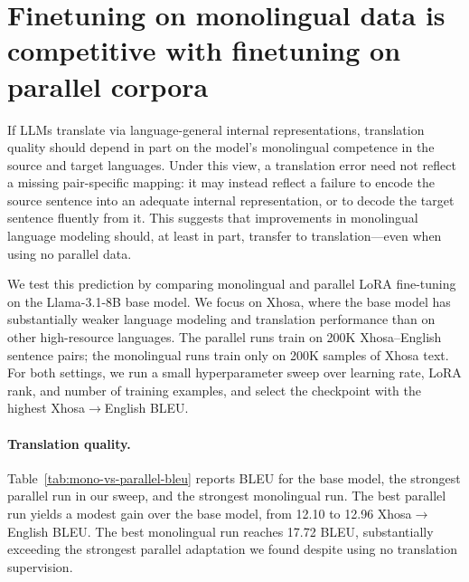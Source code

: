 \documentclass[11pt]{article}
\newcommand{\am}[1]{\textcolor{orange}{[AM: #1]}}
\begin{document}



\section{Finetuning on monolingual data is competitive with finetuning on parallel corpora}
\label{sec:monolingual-vs-parallel}

If LLMs translate via language-general internal representations, translation quality should depend in part on the model's monolingual competence in the source and target languages.
Under this view, a translation error need not reflect a missing pair-specific mapping: it may instead reflect a failure to encode the source sentence into an adequate internal representation, or to decode the target sentence fluently from it.
This suggests that improvements in monolingual language modeling should, at least in part, transfer to translation---even when using no parallel data.

We test this prediction by comparing monolingual and parallel LoRA fine-tuning on the Llama-3.1-8B base model.
We focus on Xhosa, where the base model has substantially weaker language modeling and translation performance than on other high-resource languages.
The parallel runs train on 200K Xhosa--English sentence pairs; the monolingual runs train only on 200K samples of Xhosa text.
For both settings, we run a small hyperparameter sweep over learning rate, LoRA rank, and number of training examples, and select the checkpoint with the highest Xhosa$\rightarrow$English BLEU.

\paragraph{Translation quality.}
Table~\ref{tab:mono-vs-parallel-bleu} reports BLEU for the base model, the strongest parallel run in our sweep, and the strongest monolingual run.
The best parallel run yields a modest gain over the base model, from 12.10 to 12.96 Xhosa$\rightarrow$English BLEU.
The best monolingual run reaches 17.72 BLEU, substantially exceeding the strongest parallel adaptation we found despite using no translation supervision.
\end{document}
